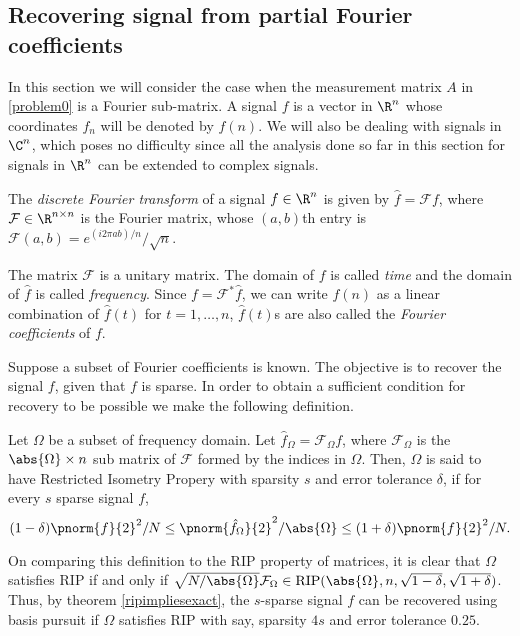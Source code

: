 \subsection{Recovering signal from partial Fourier coefficients}
	In this section we will consider the case when the
	measurement matrix $A$ in \eqref{problem0} is
	a Fourier sub-matrix. 
	A signal $f$ is a vector in $\R^n$ whose coordinates $f_n$
	will be denoted by $f(n)$. We will also be dealing with
	signals in $\C^n$, which poses no difficulty since all
	the analysis
	done so far in this section for signals in $\R^n$ can be
	extended to complex signals.
	\begin{definition}
		The \emph{discrete Fourier transform} of a signal $f\in \R^n$
		is given by $\hat{f} = \mathcal{F}f$,
		where $\mathcal{F}\in \R^{n\times n}$ is the Fourier matrix,
		whose $(a, b)$th entry is $\mathcal{F}(a,b) =
		e^{(i2\pi ab)/n}/\sqrt{n}$.
	\end{definition}
	The	matrix $\mathcal{F}$ is a unitary matrix.
	The domain of $f$ is called \emph{time} and the
	domain of $\hat{f}$ is
	called \emph{frequency}.
	Since
	$f = \mathcal{F}^* \hat{f}$, we can write $f(n)$ as
	a linear combination of $\hat{f}(t)$ for $t = 1,\ldots, n$,
	$\hat{f}(t)$s are also called the \emph{Fourier coefficients}
	of $f$.

	Suppose a subset of Fourier coefficients is known.
	The objective is to recover the signal $f$, given that
	$f$ is sparse. In order to obtain a sufficient
	condition for recovery to be possible we make the
	following definition.

	\begin{definition}
		Let $\Omega$ be a subset of frequency domain.
		Let $\hat{f}_{\Omega} = \mathcal{F}_\Omega f$, where
		$\mathcal{F}_\Omega$ is the $\abs{\Omega}\times n$
		sub matrix of $\mathcal{F}$ formed by the indices in
		$\Omega$. Then, $\Omega$ is said to have
		Restricted Isometry Propery with sparsity $s$ and
		error tolerance $\delta$, if for every $s$ sparse signal $f$,
		\[
			(1-\delta){\pnorm{f}{2}^2}/{N}\leq
			{\pnorm{\hat{f}_{\Omega}}{2}^2}/{\abs{\Omega}}\leq
			(1+\delta) {\pnorm{f}{2}^2}/{N}.
		\]
	\end{definition}
	On comparing this definition to the RIP
	property of matrices, it is clear that $\Omega$ satisfies
	RIP if and only if $\sqrt{N/\abs{\Omega}}\mathcal{F}_\Omega
	\in \mbox{RIP}(\abs{\Omega}, n,
	\sqrt{1-\delta}, \sqrt{1+\delta})$.
	Thus, by theorem \ref{ripimpliesexact}, the $s$-sparse
	signal $f$ can be recovered using basis pursuit
	if $\Omega$ satisfies RIP with say, sparsity
	$4s$ and error tolerance $0.25$.


